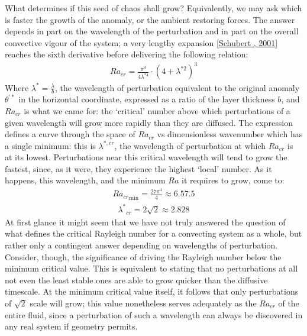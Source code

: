 \documentclass[letterpaper,10pt,english]{jupyterBook}
\begin{document}
\sphinxAtStartPar
What determines if this seed of chaos shall grow? Equivalently, we may ask which is faster \sphinxhyphen{} the growth of the anomaly, or the ambient restoring forces. The answer depends in part on the wavelength of the perturbation and in part on the overall convective vigour of the system; a very lengthy expansion {[}\hyperlink{cite.references:id663}{Schubert , 2001}{]} reaches the sixth derivative before delivering the following relation:
\begin{equation*}
\begin{split} Ra_{cr} = \frac{\pi^4}{4\lambda^{*4}} \cdot \left( 4 + \lambda^{*2} \right) ^3 \end{split}
\end{equation*}
\sphinxAtStartPar
Where \(\lambda^*=\frac{\lambda}{b}\), the wavelength of perturbation equivalent to the original anomaly \(\theta^{'*}\) in the horizontal coordinate, expressed as a ratio of the layer thickness \(b\), and \(Ra_{cr}\) is what we came for: the ‘critical’  number above which perturbations of a given wavelength will grow more rapidly than they are diffused. The expression defines a curve through the space of \(Ra_{cr}\) vs dimensionless wavenumber which has a single minimum: this is \(\lambda^{*, cr}\), the wavelength of perturbation at which \(Ra_{cr}\) is at its lowest. Perturbations near this critical wavelength will tend to grow the fastest, since, as it were, they experience the highest ‘local’  number. As it happens, this wavelength, and the minimum \(Ra\) it requires to grow, come to:
\begin{equation*}
\begin{split} {Ra_{cr}}_{\min} = \frac{27\pi^4}{4} \approx 6.57.5 \end{split}
\end{equation*}\begin{equation*}
\begin{split} {\lambda^{*}}_{cr} = 2 \sqrt{2} \approx 2.828 \end{split}
\end{equation*}
\sphinxAtStartPar
At first glance it might seem that we have not truly answered the question of what defines the critical Rayleigh number for a convecting system as a whole, but rather only a contingent answer depending on wavelengths of perturbation. Consider, though, the significance of driving the Rayleigh number below the minimum critical value. This is equivalent to stating that no perturbations at all \sphinxhyphen{} not even the least stable ones \sphinxhyphen{} are able to grow quicker than the diffusive timescale. At the minimum critical value itself, it follows that only perturbations of \(\sqrt{2}\) scale will grow; this value nonetheless serves adequately as the \(Ra_{cr}\) of the entire fluid, since a perturbation of such a wavelength can always be discovered in any real system \sphinxhyphen{} if geometry permits.
\end{document}
